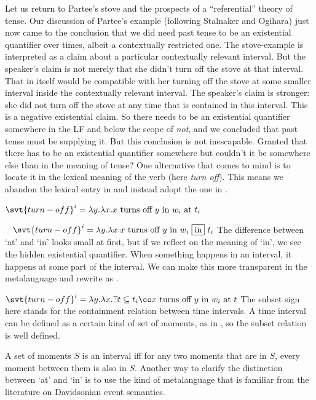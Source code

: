 Let us return to Partee's stove and the prospects of a ``referential'' theory of
tense. Our discussion of Partee's example (following Stalnaker and Ogihara) just
now came to the conclusion that we did need past tense to be an existential
quantifier over times, albeit a contextually restricted one. The stove-example
is interpreted as a claim about a particular contextually relevant interval. But
the speaker's claim is not merely that she didn't turn off the stove at that
interval. That in itself would be compatible with her turning off the stove at
some smaller interval inside the contextually relevant interval. The speaker's
claim is stronger: she did not turn off the stove at any time that is contained
in this interval. This is a negative existential claim. So there needs to be an
existential quantifier somewhere in the LF and below the scope of \emph{not},
and we concluded that past tense must be supplying it. But this conclusion is
not inescapable. Granted that there has to be an existential quantifier
somewhere \dash but couldn't it be somewhere else than in the meaning of tense?
One alternative that comes to mind is to locate it in the lexical meaning of the
verb (here \emph{turn off}). This means we abandon the lexical entry in \Next
and instead adopt the one in \NNext.

\ex $\svt{turn-off}^{i} = \lambda y. \lambda x. x\ \text{turns
  off}\ y\ \text{in}\ w_{i}\ \text{at}\ t_{i}$ \label{ex:turnoff-at}\xe

\ex~ $\svt{turn-off}^{i} = \lambda y. \lambda x. x\ \text{turns
  off}\ y\ \text{in}\ w_{i}\ \boxed{\text{in}}\ t_{i}$\label{ex:turnoff-in} \xe
%
The difference between `at' and `in' looks small at first, but if we reflect on
the meaning of `in', we see the hidden existential quantifier. When something
happens in an interval, it happens at some part of the interval. We can make
this more transparent in the metalanguage and rewrite \Last as \Next.

\ex
$\svt{turn-off}^{i} = \lambda y. \lambda x. \exists t \subseteq t_{i}\co x\
\text{turns off}\ y\ \text{in}\ w_{i}\ \text{at}\ t$ \label{ex:turnoff-ex}\xe
%
The subset sign here stands for the containment relation between time intervals.
A time interval can be defined as a certain kind of set of moments, as in \Next,
so the subset relation is well defined.

\ex A set of moments $S$ is an interval iff for any two moments that are in $S$,
every moment between them is also in $S$.\xe
%
Another way to clarify the distinction between `at' and `in' is to use the kind
of metalanguage that is familiar from the literature on Davidsonian event
semantics.

